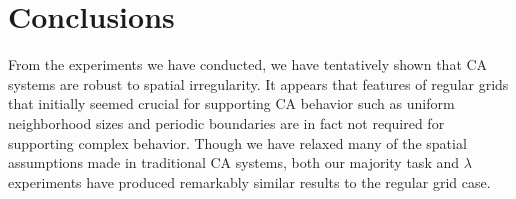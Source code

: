 \documentclass[a4paper,11pt]{article}
\begin{document}


\section{Conclusions}
\label{sec:Conclusion}
From the experiments we have conducted, we have tentatively shown that CA systems are robust to spatial irregularity. It appears that features of regular grids that initially seemed crucial for supporting CA behavior such as uniform neighborhood sizes and periodic boundaries are in fact not required for supporting complex behavior. Though we have relaxed many of the spatial assumptions made in traditional CA systems, both our majority task and $\lambda$ experiments have produced remarkably similar results to the regular grid case.
\end{document}
